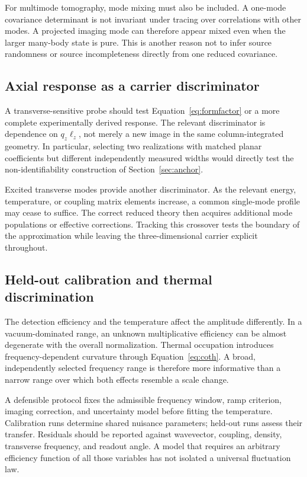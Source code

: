 \documentclass[11pt,a4paper]{article}
\theoremstyle{definition}
\theoremstyle{remark}
\newcommand{\lop}{\ell_z}
\begin{document}
For multimode tomography, mode mixing must also be included. A one-mode covariance determinant is not invariant under tracing over correlations with other modes. A projected imaging mode can therefore appear mixed even when the larger many-body state is pure. This is another reason not to infer source randomness or source incompleteness directly from one reduced covariance.\cite{weedbrook,foundation}

\subsection{Axial response as a carrier discriminator}
A transverse-sensitive probe should test Equation~\eqref{eq:formfactor} or a more complete experimentally derived response. The relevant discriminator is dependence on $q_z\lop$, not merely a new image in the same column-integrated geometry. In particular, selecting two realizations with matched planar coefficients but different independently measured widths would directly test the non-identifiability construction of Section~\ref{sec:anchor}.

Excited transverse modes provide another discriminator. As the relevant energy, temperature, or coupling matrix elements increase, a common single-mode profile may cease to suffice. The correct reduced theory then acquires additional mode populations or effective corrections. Tracking this crossover tests the boundary of the approximation while leaving the three-dimensional carrier explicit throughout.

\subsection{Held-out calibration and thermal discrimination}
The detection efficiency and the temperature affect the amplitude differently. In a vacuum-dominated range, an unknown multiplicative efficiency can be almost degenerate with the overall normalization. Thermal occupation introduces frequency-dependent curvature through Equation~\eqref{eq:coth}. A broad, independently selected frequency range is therefore more informative than a narrow range over which both effects resemble a scale change.

A defensible protocol fixes the admissible frequency window, ramp criterion, imaging correction, and uncertainty model before fitting the temperature. Calibration runs determine shared nuisance parameters; held-out runs assess their transfer. Residuals should be reported against wavevector, coupling, density, transverse frequency, and readout angle. A model that requires an arbitrary efficiency function of all those variables has not isolated a universal fluctuation law.
\end{document}
